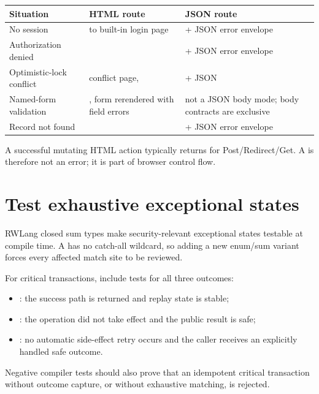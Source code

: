 \begin{longtable}{L{0.27\textwidth}L{0.31\textwidth}L{0.31\textwidth}}
\toprule
Situation & HTML route & JSON route \\
\midrule
\endhead
No session &  to built-in login page &  + JSON error envelope \\
\addlinespace
Authorization denied &  &  + JSON error envelope \\
\addlinespace
Optimistic-lock conflict &  conflict page,  &  + JSON  \\
\addlinespace
Named-form validation & , form rerendered with field errors & not a JSON body mode; body contracts are exclusive \\
\addlinespace
Record not found &  &  + JSON error envelope \\
\bottomrule
\end{longtable}

A successful mutating HTML action typically returns  for Post/Redirect/Get. A  is therefore not an error; it is part of browser control flow.

\section{Test exhaustive exceptional states}

RWLang closed sum types make security-relevant exceptional states testable at compile time. A  has no catch-all wildcard, so adding a new enum/sum variant forces every affected match site to be reviewed.

For critical transactions, include tests for all three outcomes:

\begin{itemize}
  \item {}: the success path is returned and replay state is stable;
  \item {}: the operation did not take effect and the public result is safe;
  \item {}: no automatic side-effect retry occurs and the caller receives an explicitly handled safe outcome.
\end{itemize}

Negative compiler tests should also prove that an idempotent critical transaction without outcome capture, or without exhaustive matching, is rejected.

